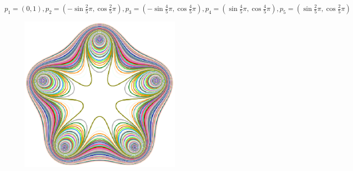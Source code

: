 \documentclass{article}
\begin{document}
\begin{exa}
$p_1 =(0,1), p_2=(-\sin{\frac{2}{5}\pi},\cos{\frac{2}{5}\pi}), p_3=(-\sin{\frac{4}{5}\pi},\cos{\frac{4}{5}\pi}), p_4=(\sin{\frac{4}{5}\pi},\cos{\frac{4}{5}\pi}), p_5=(\sin{\frac{2}{5}\pi},\cos{\frac{2}{5}\pi})$
\begin{figure}[H]
\begin{center}
\includegraphics[width=8cm]{images/cassini5_star.eps}
\caption{}
\label{ }
\end{center}
\end{figure}
\end{exa}
\end{document}
